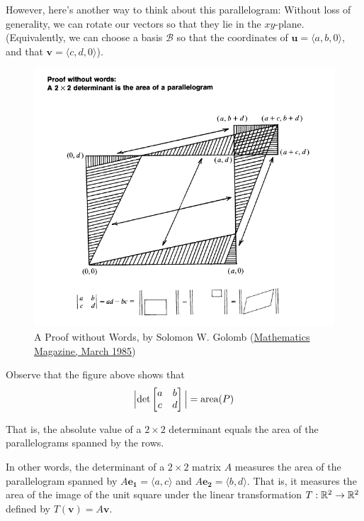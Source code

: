 However, here's another way to think about this parallelogram: Without loss of generality, we can rotate our vectors so that they lie in the $xy$-plane.  (Equivalently, we can choose a basis $\mathcal{B}$ so that the coordinates of $\bm{u} = \langle a, b, 0 \rangle$, and that $\bm{v} = \langle c, d, 0 \rangle$).

\begin{figure}[H]
    \centering
    \includegraphics[scale=0.5]{images/2x2detproof.png}
    \caption{A Proof without Words, by Solomon W. Golomb (\href{https://www.tandfonline.com/doi/abs/10.1080/0025570X.1985.11977163}{Mathematics Magazine, March 1985})}
\end{figure}

Observe that the figure above shows that \begin{equation*}
        \Big|\textnormal{det}\begin{bmatrix}
a & b \\
c & d
\end{bmatrix}\Big| = \textnormal{area}(P)
    \end{equation*}
    
       That is, the absolute value of a $2 \times 2$
determinant equals the area of the parallelograms spanned by the rows.  

In other words, the determinant of a $2 \times 2$ matrix $A$ measures the area of the parallelogram spanned by $A\bm{e_1} = \langle a, c \rangle $ and $A\bm{e_2} = \langle b, d \rangle$.   That is, it measures the area of the image of the unit square under the linear transformation $T: \mathbb{R}^2 \to \mathbb{R}^2$ defined by $T(\bm{v}) = A\bm{v}$.

